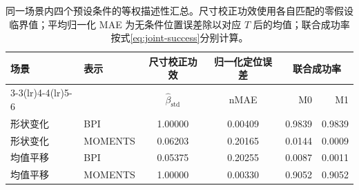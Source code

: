 \begin{table}[ht]
\centering
\caption{同一场景内四个预设条件的等权描述性汇总。尺寸校正功效使用各自匹配的零假设临界值；平均归一化 MAE 为无条件位置误差除以对应 $T$ 后的均值；联合成功率按式\eqref{eq:joint-success}分别计算。}\label{tab:h1-power}
\begingroup
\footnotesize
\setlength{\tabcolsep}{3.5pt}
\begin{tabular}{llccrr}
\toprule
场景 & 表示 & 尺寸校正功效 & 归一化定位误差 & \multicolumn{2}{c}{联合成功率}\\
\cmidrule(lr){3-3}\cmidrule(lr){4-4}\cmidrule(lr){5-6}
 & & $\widehat\beta_{\mathrm{std}}$ & nMAE & M0 & M1\\
\midrule
形状变化 & BPI & 1.00000 & 0.00409 & 0.9839 & 0.9839\\
形状变化 & MOMENTS & 0.06203 & 0.20165 & 0.0144 & 0.0009\\
均值平移 & BPI & 0.05375 & 0.20255 & 0.0087 & 0.0011\\
均值平移 & MOMENTS & 1.00000 & 0.00330 & 0.9052 & 0.9052\\
\bottomrule
\end{tabular}
\endgroup
\end{table}
